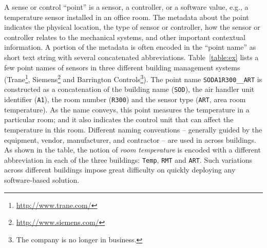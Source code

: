 A sense or control ``point'' is a sensor,
a controller, or a software value, e.g., a temperature sensor
installed in an office room. The metadata about the point indicates the physical
location, the type of sensor or controller, how the sensor or controller relates
to the mechanical systems, and other important contextual information. A portion of
the metadata is often encoded in the
``point name'' as short
text string with several concatenated abbreviations. Table~\ref{table:ex} lists 
a few point names of sensors in three different building management systems 
(Trane\footnote{\url{http://www.trane.com/}}, Siemens\footnote{\url{http://www.siemens.com/}} 
and Barrington Controls\footnote{The company is no longer in business.}). 
The point name \texttt{SODA1R300\_\_ART} is constructed as a
concatenation of the building name (\texttt{SOD}), the air handler unit
identifier (\texttt{A1}), the room number (\texttt{R300}) and the sensor type
(\texttt{ART}, area room temperature). As the name conveys, this point measures 
the temperature in a particular room; and it also indicates the control unit that 
can affect the temperature in this room. Different naming conventions -- 
generally guided by the equipment, vendor, manufacturer, 
and contractor --
are used in across buildings. As shown in the table, the notion of {\em room temperature} is encoded 
with a different abbreviation in each of the three buildings: \texttt{Temp}, \texttt{RMT} and \texttt{ART}.
Such variations across different buildings impose great difficulty on quickly deploying any software-based
solution.


